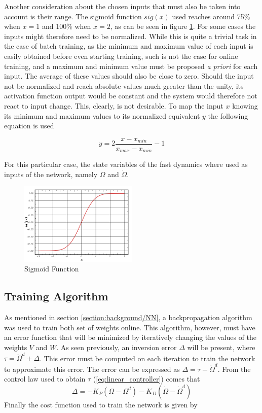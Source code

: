 Another consideration about the chosen inputs that must also be taken into account is their range. The sigmoid function $sig(x)$ used reaches around 75\% when $x=1$ and 100\% when $x=2$, as can be seen in figure \ref{fig:sigmoid}. For some cases the inputs might therefore need to be normalized. While this is quite a trivial task in the case of batch training, as the minimum and maximum value of each input is easily obtained before even starting training, such is not the case for online training, and a maximum and minimum value must be proposed \emph{a priori} for each input. The average of these values should also be close to zero. Should the input not be normalized and reach absolute values much greater than the unity, its activation function output would be constant and the system would therefore not react to input change. This, clearly, is not desirable. To map the input $x$ knowing its minimum and maximum values to its normalized equivalent $y$ the following equation is used

\begin{equation}
y=2\dfrac{x-x_{min}}{x_{max}-x_{min}}-1
\label{eq:normalisation}
\end{equation}

For this  particular case, the state variables of the fast dynamics where used as inputs of the network, namely $\Omega$ and $\dot{\Omega}$.

\begin{figure}[!htb]
  \centering
  \includegraphics[width=0.5\textwidth]{Figures/sigmoid.png}
  \caption[Sigmoid Function]{Sigmoid Function}
  \label{fig:sigmoid}
\end{figure}

\subsection{Training Algorithm}

As mentioned in section \ref{section:background/NN}, a backpropagation algorithm was used to train both set of weights online. This algorithm, however, must have an error function that will be minimized by iteratively changing the values of the weights $V$ and $W$. As seen previously, an inversion error $\Delta$ will be present, where $\tau = \ddot{\Omega}^d + \Delta$. This error must be computed on each iteration to train the network to approximate this error. The error can be expressed as $\Delta=\tau - \ddot{\Omega}^d$. From the control law used to obtain $\tau$ (\ref{eq:linear_controller}) comes that
\begin{equation}
\Delta = -K_P(\Omega-\Omega^d)-K_D(\dot{\Omega}-\dot{\Omega}^d)
\label{eq:inversion_error}
\end{equation}
Finally the cost function used to train the network is given by

